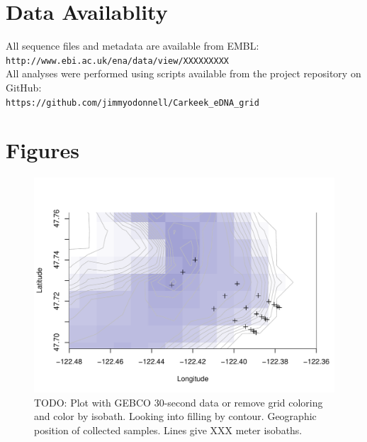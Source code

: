 \documentclass[11pt,letterpaper]{article} %
\begin{document}
\section*{Data Availablity}
All sequence files and metadata are available from EMBL:\\ \verb!http://www.ebi.ac.uk/ena/data/view/XXXXXXXXX! \\
All analyses were performed using scripts available from the project repository on GitHub:\\  \verb!https://github.com/jimmyodonnell/Carkeek_eDNA_grid!\\



\section*{Figures}

\begin{figure}[h!] %
  \centering
    \includegraphics[width=1\textwidth]{../../Figures/site_map.pdf}
    \caption{TODO: Plot with GEBCO 30-second data or remove grid coloring and color by isobath. Looking into filling by contour. Geographic position of collected samples. Lines give XXX meter isobaths.}
  \label{site_map} %
\end{figure}
\end{document}
